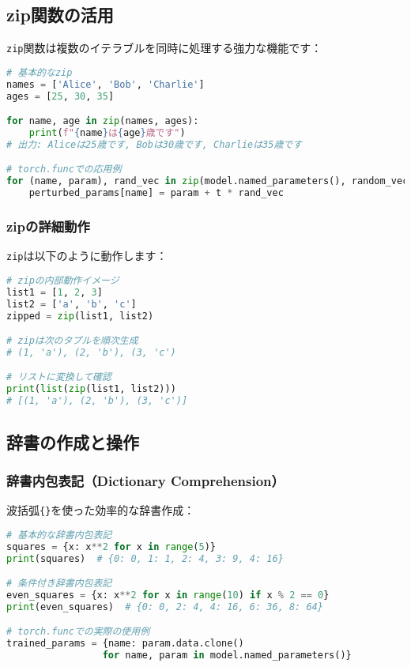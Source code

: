 \documentclass{ltjsarticle}      %
\begin{document}
\subsection{zip関数の活用}
\texttt{zip}関数は複数のイテラブルを同時に処理する強力な機能です：

\begin{lstlisting}[language=Python]
# 基本的なzip
names = ['Alice', 'Bob', 'Charlie']
ages = [25, 30, 35]

for name, age in zip(names, ages):
    print(f"{name}は{age}歳です")
# 出力: Aliceは25歳です, Bobは30歳です, Charlieは35歳です

# torch.funcでの応用例
for (name, param), rand_vec in zip(model.named_parameters(), random_vector):
    perturbed_params[name] = param + t * rand_vec
\end{lstlisting}

\subsubsection{zipの詳細動作}
\texttt{zip}は以下のように動作します：

\begin{lstlisting}[language=Python]
# zipの内部動作イメージ
list1 = [1, 2, 3]
list2 = ['a', 'b', 'c']
zipped = zip(list1, list2)

# zipは次のタプルを順次生成
# (1, 'a'), (2, 'b'), (3, 'c')

# リストに変換して確認
print(list(zip(list1, list2)))
# [(1, 'a'), (2, 'b'), (3, 'c')]
\end{lstlisting}

\subsection{辞書の作成と操作}

\subsubsection{辞書内包表記（Dictionary Comprehension）}
波括弧\texttt{\{\}}を使った効率的な辞書作成：

\begin{lstlisting}[language=Python]
# 基本的な辞書内包表記
squares = {x: x**2 for x in range(5)}
print(squares)  # {0: 0, 1: 1, 2: 4, 3: 9, 4: 16}

# 条件付き辞書内包表記
even_squares = {x: x**2 for x in range(10) if x % 2 == 0}
print(even_squares)  # {0: 0, 2: 4, 4: 16, 6: 36, 8: 64}

# torch.funcでの実際の使用例
trained_params = {name: param.data.clone() 
                 for name, param in model.named_parameters()}
\end{lstlisting}
\end{document}
